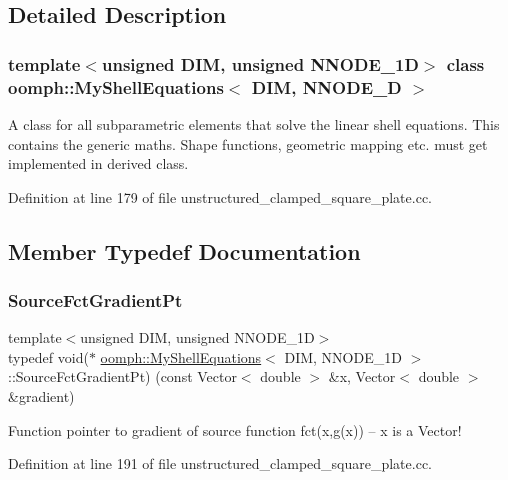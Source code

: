 \subsection{Detailed Description}
\subsubsection*{template$<$unsigned D\+IM, unsigned N\+N\+O\+D\+E\+\_\+1D$>$\newline
class oomph\+::\+My\+Shell\+Equations$<$ D\+I\+M, N\+N\+O\+D\+E\+\_\+D $>$}

A class for all subparametric elements that solve the linear shell equations. This contains the generic maths. Shape functions, geometric mapping etc. must get implemented in derived class. 

Definition at line 179 of file unstructured\+\_\+clamped\+\_\+square\+\_\+plate.\+cc.



\subsection{Member Typedef Documentation}
\mbox{\label{classoomph_1_1MyShellEquations_a954dcc1b78710f331ed390b716aa07dd}} 
\subsubsection{\texorpdfstring{Source\+Fct\+Gradient\+Pt}{SourceFctGradientPt}}
{\footnotesize\ttfamily template$<$unsigned D\+IM, unsigned N\+N\+O\+D\+E\+\_\+1D$>$ \\
typedef void($\ast$ \hyperlink{classoomph_1_1MyShellEquations}{oomph\+::\+My\+Shell\+Equations}$<$ D\+IM, N\+N\+O\+D\+E\+\_\+1D $>$\+::Source\+Fct\+Gradient\+Pt) (const Vector$<$ double $>$ \&x, Vector$<$ double $>$ \&gradient)}



Function pointer to gradient of source function fct(x,g(x)) -- x is a Vector! 



Definition at line 191 of file unstructured\+\_\+clamped\+\_\+square\+\_\+plate.\+cc.

\mbox{\label{classoomph_1_1MyShellEquations_a056d2488b6e65787f5c9935a321b7a9b}} 
